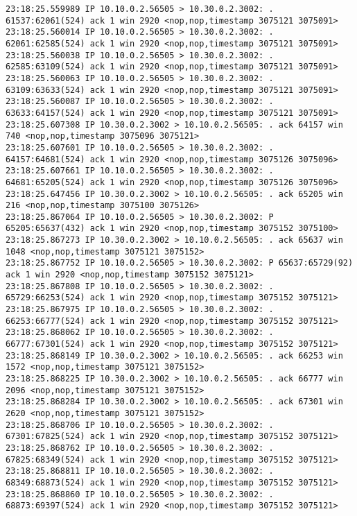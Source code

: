 \documentclass[a4paper,12pt]{article}
\begin{document}
\begin{Verbatim}
23:18:25.559989 IP 10.10.0.2.56505 > 10.30.0.2.3002: . 61537:62061(524) ack 1 win 2920 <nop,nop,timestamp 3075121 3075091>
23:18:25.560014 IP 10.10.0.2.56505 > 10.30.0.2.3002: . 62061:62585(524) ack 1 win 2920 <nop,nop,timestamp 3075121 3075091>
23:18:25.560038 IP 10.10.0.2.56505 > 10.30.0.2.3002: . 62585:63109(524) ack 1 win 2920 <nop,nop,timestamp 3075121 3075091>
23:18:25.560063 IP 10.10.0.2.56505 > 10.30.0.2.3002: . 63109:63633(524) ack 1 win 2920 <nop,nop,timestamp 3075121 3075091>
23:18:25.560087 IP 10.10.0.2.56505 > 10.30.0.2.3002: . 63633:64157(524) ack 1 win 2920 <nop,nop,timestamp 3075121 3075091>
23:18:25.607308 IP 10.30.0.2.3002 > 10.10.0.2.56505: . ack 64157 win 740 <nop,nop,timestamp 3075096 3075121>
23:18:25.607601 IP 10.10.0.2.56505 > 10.30.0.2.3002: . 64157:64681(524) ack 1 win 2920 <nop,nop,timestamp 3075126 3075096>
23:18:25.607661 IP 10.10.0.2.56505 > 10.30.0.2.3002: . 64681:65205(524) ack 1 win 2920 <nop,nop,timestamp 3075126 3075096>
23:18:25.647456 IP 10.30.0.2.3002 > 10.10.0.2.56505: . ack 65205 win 216 <nop,nop,timestamp 3075100 3075126>
23:18:25.867064 IP 10.10.0.2.56505 > 10.30.0.2.3002: P 65205:65637(432) ack 1 win 2920 <nop,nop,timestamp 3075152 3075100>
23:18:25.867273 IP 10.30.0.2.3002 > 10.10.0.2.56505: . ack 65637 win 1048 <nop,nop,timestamp 3075121 3075152>
23:18:25.867752 IP 10.10.0.2.56505 > 10.30.0.2.3002: P 65637:65729(92) ack 1 win 2920 <nop,nop,timestamp 3075152 3075121>
23:18:25.867808 IP 10.10.0.2.56505 > 10.30.0.2.3002: . 65729:66253(524) ack 1 win 2920 <nop,nop,timestamp 3075152 3075121>
23:18:25.867975 IP 10.10.0.2.56505 > 10.30.0.2.3002: . 66253:66777(524) ack 1 win 2920 <nop,nop,timestamp 3075152 3075121>
23:18:25.868062 IP 10.10.0.2.56505 > 10.30.0.2.3002: . 66777:67301(524) ack 1 win 2920 <nop,nop,timestamp 3075152 3075121>
23:18:25.868149 IP 10.30.0.2.3002 > 10.10.0.2.56505: . ack 66253 win 1572 <nop,nop,timestamp 3075121 3075152>
23:18:25.868225 IP 10.30.0.2.3002 > 10.10.0.2.56505: . ack 66777 win 2096 <nop,nop,timestamp 3075121 3075152>
23:18:25.868284 IP 10.30.0.2.3002 > 10.10.0.2.56505: . ack 67301 win 2620 <nop,nop,timestamp 3075121 3075152>
23:18:25.868706 IP 10.10.0.2.56505 > 10.30.0.2.3002: . 67301:67825(524) ack 1 win 2920 <nop,nop,timestamp 3075152 3075121>
23:18:25.868762 IP 10.10.0.2.56505 > 10.30.0.2.3002: . 67825:68349(524) ack 1 win 2920 <nop,nop,timestamp 3075152 3075121>
23:18:25.868811 IP 10.10.0.2.56505 > 10.30.0.2.3002: . 68349:68873(524) ack 1 win 2920 <nop,nop,timestamp 3075152 3075121>
23:18:25.868860 IP 10.10.0.2.56505 > 10.30.0.2.3002: . 68873:69397(524) ack 1 win 2920 <nop,nop,timestamp 3075152 3075121>

\end{Verbatim}
\end{document}
